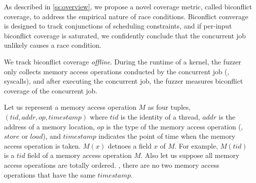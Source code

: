 
As described in \autoref{ss:overview}, we propose a novel coverage
metric, called biconflict coverage, to address the empirical nature of
race conditions.
%
Biconflict converage is designed to track conjunctions of scheduling
constraints, and if per-input biconflict coverage is saturated, we
confidently conclude that the concurrent job unlikely causes a race
condition.

We track biconflict coverage \textit{offline}. During the runtime of a
kernel, the fuzzer only collects memory access operations conducted by
the concurrent job (\eg, syscalls), and after executing the concurrent
job, the fuzzer measures biconflict coverage of the concurrent job.

%
Let us represent a memory access operation $M$ as four tuples,
$(tid, addr, op, timestamp)$ where $tid$ is the identity of a thread,
$addr$ is the address of a memory location, $op$ is the type of the
memory access operation (\ie, $store$ or $load$), and $timestamp$
indicates the point of time when the memory access operation is taken.
%
$M(x)$ detnoes a field $x$ of $M$. For example, $M(tid)$ is a $tid$
field of a memory access operation $M$.
%
Also let us suppose all memory access operations are totally
ordered. \ie, there are no two memory access operations that have the
same $timestamp$.

